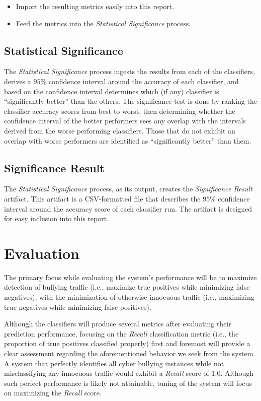 \documentclass[conference]{sig-alternate-05-2015}
\begin{document}
\begin{itemize}
  \item Import the resulting metrics easily into this report.
  \item Feed the metrics into the \textit{Statistical Significance} process.
\end{itemize}

\subsection{Statistical Significance}\label{subsec:stat_significance}
The \textit{Statistical Significance} process ingests the results from each of the
classifiers, derives a $95$\% confidence interval around the accuracy of each
classifier, and based on the confidence interval determines which (if any)
classifier is ``significantly better'' than the others. The significance test
is done by ranking the classifier accuracy scores from best to worst, then
determining whether the confidence interval of the better performers sees any
overlap with the intervals derived from the worse performing classifiers. Those
that do not exhibit an overlap with worse performers are identified as
``significantly better'' than them.

\subsection{Significance Result}\label{subsec:stat_sig_result}
The \textit{Statistical Significance} process, as its output, creates the
\textit{Significance Result} artifact. This artifact is a CSV-formatted file
that describes the $95$\% confidence interval around the accuracy score of each
classifier run. The artifact is designed for easy inclusion into this report.

\section{Evaluation}\label{sec:evaluation}

The primary focus while evaluating the system's performance will be to maximize
detection of bullying traffic (i.e., maximize true positives while minimizing
false negatives), with the minimization of otherwise innocuous traffic (i.e.,
maximizing true negatives while minimizing false positives).

Although the classifiers will produce several metrics after evaluating their
prediction performance, focusing on the \textit{Recall} classification metric
(i.e., the proportion of true positives classified properly) first and foremost
will provide a clear assessment regarding the aforementioned behavior we seek
from the system. A system that perfectly identifies all cyber bullying instances
while not misclassifying any innocuous traffic would exhibit a \textit{Recall}
score of 1.0. Although such perfect performance is likely not attainable, tuning
of the system will focus on maximizing the \textit{Recall} score.
\end{document}
